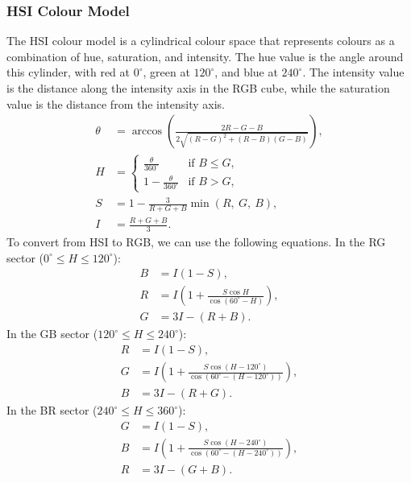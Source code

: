 \documentclass{article}
\begin{document}
\subsubsection{HSI Colour Model}
The HSI colour model is a cylindrical colour space that represents
colours as a combination of hue, saturation, and intensity. The hue
value is the angle around this cylinder, with red at \(0^{\circ}\), green at
\(120^{\circ}\), and blue at \(240^{\circ}\). The intensity value is the
distance along the intensity axis in the RGB cube, while the saturation
value is the distance from the intensity axis.
\begin{align}
    \theta & = \arccos\left( \frac{2R - G - B}{2\sqrt{\left( R - G \right)^2 + \left( R - B \right)\left( G - B \right)}} \right), \\
    H & = \begin{cases}
        \frac{\theta}{360^{\circ}} & \text{if } B \leqslant G, \\
        1 - \frac{\theta}{360^{\circ}} & \text{if } B > G,
    \end{cases} \\
    S & = 1 - \frac{3}{R + G + B} \min\left( R,\: G,\: B \right), \\
    I & = \frac{R + G + B}{3}.
\end{align}
To convert from HSI to RGB, we can use the following equations. In the
RG sector (\(0^{\circ} \leqslant H \leqslant 120^{\circ}\)):
\begin{align*}
    B & = I\left( 1 - S \right), \\
    R & = I\left( 1 + \frac{S\cos H}{\cos\left( 60^{\circ} - H \right)} \right), \\
    G & = 3I - \left( R + B \right).
\end{align*}
In the GB sector (\(120^{\circ} \leqslant H \leqslant 240^{\circ}\)):
\begin{align*}
    R & = I\left( 1 - S \right), \\
    G & = I\left( 1 + \frac{S\cos\left( H - 120^{\circ} \right)}{\cos\left( 60^{\circ} - \left( H - 120^{\circ} \right) \right)} \right), \\
    B & = 3I - \left( R + G \right).
\end{align*}
In the BR sector (\(240^{\circ} \leqslant H \leqslant 360^{\circ}\)):
\begin{align*}
    G & = I\left( 1 - S \right), \\
    B & = I\left( 1 + \frac{S\cos\left( H - 240^{\circ} \right)}{\cos\left( 60^{\circ} - \left( H - 240^{\circ} \right) \right)} \right), \\
    R & = 3I - \left( G + B \right).
\end{align*}
\end{document}
